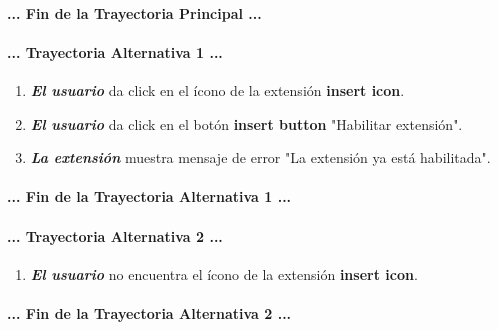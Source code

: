 \documentclass[12pt, a4paper, titlepage]{article}
\begin{document}
				\paragraph{... Fin de la Trayectoria Principal ...}
				
				\paragraph{... Trayectoria Alternativa 1 ...}
				\begin{enumerate}
					\item \textbf{\textit{El usuario}} da click en el ícono de la extensión \textbf{insert icon}.
					\item \textbf{\textit{El usuario}} da click en el botón \textbf{insert button} "Habilitar extensión".
					\item \textbf{\textit{La extensión}} muestra mensaje de error "La extensión ya está habilitada".
				\end{enumerate}
				\paragraph{... Fin de la Trayectoria Alternativa 1 ...}
				
				\paragraph{... Trayectoria Alternativa 2 ...}
				\begin{enumerate}
					\item \textbf{\textit{El usuario}} no encuentra el ícono de la extensión \textbf{insert icon}.
				\end{enumerate}
				\paragraph{... Fin de la Trayectoria Alternativa 2 ...}
			    
\end{document}
